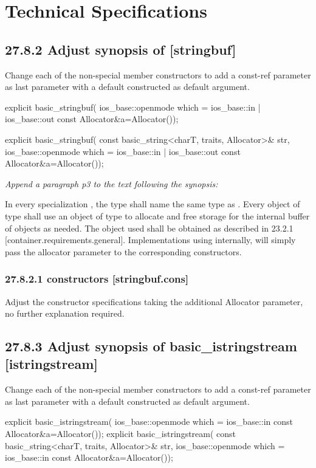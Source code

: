 \documentclass[ebook,11pt,article]{memoir}
\begin{document}
\chapter{Technical Specifications}

\section{27.8.2 Adjust synopsis of  [stringbuf]}
Change each of the non-special member constructors to add a const-ref  parameter as last parameter with a default constructed  as default argument. 
\begin{codeblock}
explicit basic_stringbuf(
        ios_base::openmode which = ios_base::in | ios_base::out
        const Allocator&a=Allocator());

explicit basic_stringbuf(
        const basic_string<charT, traits, Allocator>& str,
        ios_base::openmode which = ios_base::in | ios_base::out
        const Allocator&a=Allocator());
\end{codeblock}

\textit{Append a paragraph p3 to the text following the synopsis:}

\pnum
In every specialization , the type  shall name the same type as . Every object of type  shall use an object of type  to allocate and free storage for the internal buffer of  objects as needed. The  object used shall be obtained as described in 23.2.1 [container.requirements.general].
\enternote
Implementations using  internally, will simply pass the allocator parameter to the corresponding  constructors.
\exitnote
\subsection{27.8.2.1  constructors [stringbuf.cons]}
Adjust the constructor specifications taking the additional Allocator parameter, no further explanation required.

\section{27.8.3 Adjust synopsis of basic\_istringstream [istringstream]}
Change each of the non-special member constructors to add a const-ref  parameter as last parameter with a default constructed  as default argument. 
\begin{codeblock}
explicit basic_istringstream(
             ios_base::openmode which = ios_base::in
             const Allocator&a=Allocator());
explicit basic_istringstream(
             const basic_string<charT, traits, Allocator>& str,
             ios_base::openmode which = ios_base::in
        const Allocator&a=Allocator());
\end{codeblock}
\end{document}
